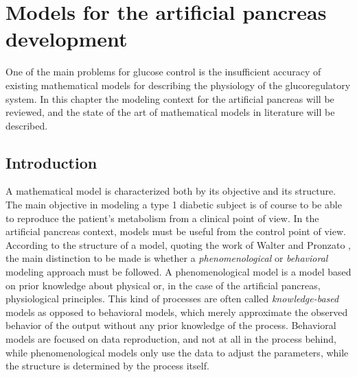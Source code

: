 
\chapter{Models for the artificial pancreas development}
\label{sec:ModelsForDiabetes}


One of the main problems for glucose control is the insufficient accuracy of existing mathematical models for describing the physiology of the glucoregulatory system. In this chapter the modeling context for the artificial pancreas will be reviewed, and the state of the art of mathematical models in literature will be described.

\section{Introduction}
\label{sec:Introductionfodiabetes}

A mathematical model is characterized both by its objective and its structure. The main objective in modeling a type 1 diabetic subject is of course to be able to reproduce the patient's metabolism from a clinical point of view. In the artificial pancreas context, models must be useful from the control point of view. According to the structure of a model, quoting the work of Walter and Pronzato \cite{walter1997}, the main distinction to be made is whether a \textit{phenomenological} or \textit{behavioral} modeling approach must be followed. A phenomenological model is a model based on prior knowledge about physical or, in the case of the artificial pancreas, physiological principles. This kind of processes are often called \textit{knowledge-based} models as opposed to behavioral models, which merely approximate the observed behavior of the output without any prior knowledge of the process. Behavioral models are focused on data reproduction, and not at all in the process behind, while phenomenological models only use the data to adjust the parameters, while the structure is determined by the process itself.

